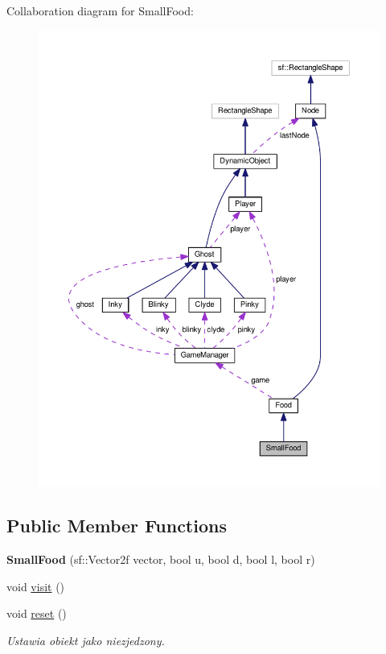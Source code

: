 Collaboration diagram for Small\+Food\+:\nopagebreak
\begin{figure}[H]
\begin{center}
\leavevmode
\includegraphics[width=350pt]{classSmallFood__coll__graph}
\end{center}
\end{figure}
\subsection*{Public Member Functions}
\begin{DoxyCompactItemize}
\item 
\mbox{\label{classSmallFood_a4d91b2c99fac555ed8c7644ea11a4fe7}} 
{\bfseries Small\+Food} (sf\+::\+Vector2f vector, bool u, bool d, bool l, bool r)
\item 
void \hyperlink{classSmallFood_a4b7a54f8b6c4045dba6c50f117923c01}{visit} ()
\item 
\mbox{\label{classSmallFood_a9a2732eae205f0a3c9c17c38d69ff8a4}} 
void \hyperlink{classSmallFood_a9a2732eae205f0a3c9c17c38d69ff8a4}{reset} ()
\begin{DoxyCompactList}\small\item\em Ustawia obiekt jako niezjedzony. \end{DoxyCompactList}\end{DoxyCompactItemize}
